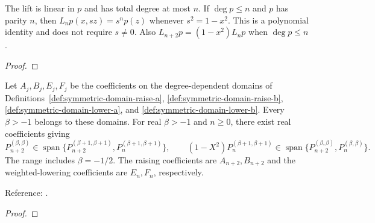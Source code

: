 \begin{supporting}

\begin{theorem}
\label{thm:disk-polynomial-lift}
\leanok
The lift is linear in $p$ and has total degree at most $n$. If $\deg p\le n$
and $p$ has parity $n$, then $L_np(x,sz)=s^np(z)$ whenever $s^2=1-x^2$.
This is a polynomial identity and does not require $s\ne0$.
Also $L_{n+2}p=(1-x^2)L_np$ when $\deg p\le n$.
\end{theorem}
\begin{proof}
\leanok
\end{proof}

\begin{theorem}
\label{thm:jacobi-symmetric-conversion}
\leanok
Let $A_j,B_j,E_j,F_j$ be the coefficients on the degree-dependent domains of
Definitions~\ref{def:symmetric-domain-raise-a},
\ref{def:symmetric-domain-raise-b}, \ref{def:symmetric-domain-lower-a}, and
\ref{def:symmetric-domain-lower-b}. Every $\beta>-1$ belongs to these domains.
For real $\beta>-1$ and $n\ge0$, there exist real coefficients giving
\[
P_{n+2}^{(\beta,\beta)}\in
\operatorname{span}\{P_{n+2}^{(\beta+1,\beta+1)},P_n^{(\beta+1,\beta+1)}\},
\qquad
(1-X^2)P_n^{(\beta+1,\beta+1)}\in
\operatorname{span}\{P_{n+2}^{(\beta,\beta)},P_n^{(\beta,\beta)}\}.
\]
The range includes $\beta=-1/2$. The raising coefficients are $A_{n+2},B_{n+2}$ and the weighted-lowering coefficients are $E_n,F_n$, respectively.

Reference: \cite[18.9(ii)]{dlmf}.
\end{theorem}
\begin{proof}
\leanok
\end{proof}



\end{supporting}
